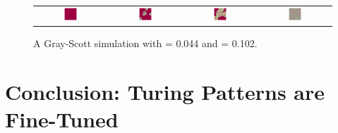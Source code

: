\begin{figure}[h]
\centering
\mySfFamily
\begin{tabular}{c c c c}
\includegraphics[width = 0.2\textwidth]{../images/f044_k102_multi_Moment_1.jpg} & \includegraphics[width = 0.2\textwidth]{../images/f044_k102_multi_Moment_2.jpg} & \includegraphics[width = 0.2\textwidth]{../images/f044_k102_multi_Moment_3.jpg} & \includegraphics[width = 0.2\textwidth]{../images/f044_k102_multi_Moment_4.jpg}
\end{tabular}
\caption{A Gray-Scott simulation with  = 0.044 and  = 0.102.}
\label{fig:gray-scott_f44_k102_first_frame}
\end{figure}


\FloatBarrier
{}

\section{Conclusion: Turing Patterns are Fine-Tuned}
\label{sec:conclusion:_turing_patterns_are_fine-tuned}


